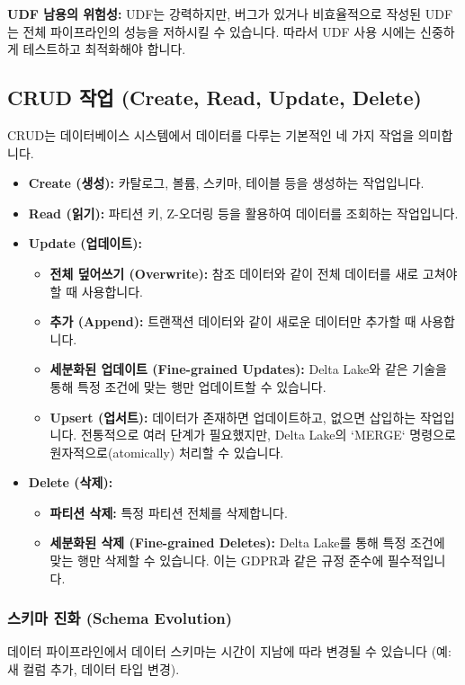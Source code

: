 \documentclass[11pt,a4paper]{article}
\begin{document}
\begin{warningbox}
\textbf{UDF 남용의 위험성:}
UDF는 강력하지만, 버그가 있거나 비효율적으로 작성된 UDF는 전체 파이프라인의 성능을 저하시킬 수 있습니다. 따라서 UDF 사용 시에는 신중하게 테스트하고 최적화해야 합니다.
\end{warningbox}

\subsection{CRUD 작업 (Create, Read, Update, Delete)}
CRUD는 데이터베이스 시스템에서 데이터를 다루는 기본적인 네 가지 작업을 의미합니다.

\begin{itemize}
    \item \textbf{Create (생성):} 카탈로그, 볼륨, 스키마, 테이블 등을 생성하는 작업입니다.
    \item \textbf{Read (읽기):} 파티션 키, Z-오더링 등을 활용하여 데이터를 조회하는 작업입니다.
    \item \textbf{Update (업데이트):}
    \begin{itemize}
        \item \textbf{전체 덮어쓰기 (Overwrite):} 참조 데이터와 같이 전체 데이터를 새로 고쳐야 할 때 사용합니다.
        \item \textbf{추가 (Append):} 트랜잭션 데이터와 같이 새로운 데이터만 추가할 때 사용합니다.
        \item \textbf{세분화된 업데이트 (Fine-grained Updates):} Delta Lake와 같은 기술을 통해 특정 조건에 맞는 행만 업데이트할 수 있습니다.
        \item \textbf{Upsert (업서트):} 데이터가 존재하면 업데이트하고, 없으면 삽입하는 작업입니다. 전통적으로 여러 단계가 필요했지만, Delta Lake의 `MERGE` 명령으로 원자적으로(atomically) 처리할 수 있습니다.
    \end{itemize}
    \item \textbf{Delete (삭제):}
    \begin{itemize}
        \item \textbf{파티션 삭제:} 특정 파티션 전체를 삭제합니다.
        \item \textbf{세분화된 삭제 (Fine-grained Deletes):} Delta Lake를 통해 특정 조건에 맞는 행만 삭제할 수 있습니다. 이는 GDPR과 같은 규정 준수에 필수적입니다.
    \end{itemize}
\end{itemize}

\subsubsection{스키마 진화 (Schema Evolution)}
데이터 파이프라인에서 데이터 스키마는 시간이 지남에 따라 변경될 수 있습니다 (예: 새 컬럼 추가, 데이터 타입 변경).
\end{document}
